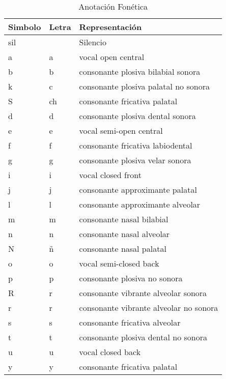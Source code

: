 \begin{table}[H]
\centering
\caption{Anotación Fonética}
\label{tab:anotacion_fonetica}
\begin{tabular}{|l|l|l|}
\textbf{Simbolo} & \textbf{Letra} & \textbf{Representación} \\ \hline
sil              & & Silencio                               \\ \hline
a                & a & vocal open central                   \\ \hline
b                & b &  consonante plosiva bilabial sonora   \\ \hline 
k                & c &  consonante plosiva palatal no sonora \\ \hline 
S                & ch &  consonante fricativa palatal        \\ \hline 
d                & d &  consonante plosiva dental sonora     \\ \hline 
e                & e &  vocal semi-open central              \\ \hline
f                & f &  consonante fricativa labiodental     \\ \hline 
g                & g &  consonante plosiva velar sonora      \\ \hline
i                & i &  vocal closed front                   \\ \hline
j                & j &  consonante approximante palatal       \\ \hline
l                & l &  consonante approximante alveolar      \\ \hline 
m                & m &  consonante nasal bilabial            \\ \hline 
n                & n &  consonante nasal alveolar            \\ \hline 
N                & ñ &  consonante nasal palatal             \\ \hline 
o                & o &  vocal semi-closed back               \\ \hline
p                & p &  consonante plosiva no sonora         \\ \hline 
R                & r &  consonante vibrante alveolar sonora   \\ \hline 
r                & r &  consonante vibrante alveolar no sonora \\ \hline
s                & s &  consonante fricativa alveolar         \\ \hline
t                & t &  consonante plosiva dental no sonora   \\ \hline
u                & u &  vocal closed back                    \\ \hline
y                & y &  consonante fricativa palatal         \\ \hline
\end{tabular}
\end{table}